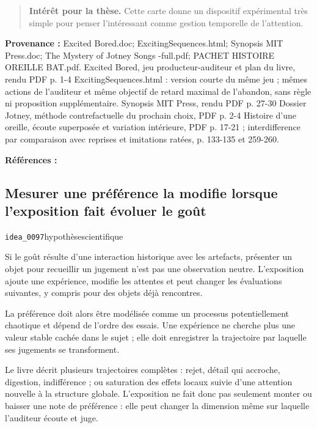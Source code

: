 \documentclass[10pt,a4paper]{article}
\begin{document}
\begin{quote}
\textbf{Intérêt pour la thèse.} Cette carte donne un dispositif expérimental très simple pour penser l'intéressant comme gestion temporelle de l'attention.
\end{quote}
{\footnotesize\color{metadata}\textbf{Provenance :} Excited Bored.doc; ExcitingSequences.html; Synopsis MIT Press.doc; The Mystery of Jotney Songs -full.pdf; PACHET HISTOIRE OREILLE BAT.pdf. Excited Bored, jeu producteur-auditeur et plan du livre, rendu PDF p. 1-4 ExcitingSequences.html : version courte du même jeu ; mêmes actions de l'auditeur et même objectif de retard maximal de l'abandon, sans règle ni proposition supplémentaire. Synopsis MIT Press, rendu PDF p. 27-30 Dossier Jotney, méthode contrefactuelle du prochain choix, PDF p. 2-4 Histoire d'une oreille, écoute superposée et variation intérieure, PDF p. 17-21 ; interdifference par comparaison avec reprises et imitations ratées, p. 133-135 et 259-260.\par}
{\footnotesize\color{metadata}\textbf{Références :} \parencite{pachet2018oreille}\par}

\subsection{Mesurer une préférence la modifie lorsque l'exposition fait évoluer le goût}
{\small\color{metadata} \texttt{idea\_0097}\quad\textbullet\quad hypothèse\quad\textbullet\quad scientifique\par}

Si le goût résulte d'une interaction historique avec les artefacts, présenter un objet pour recueillir un jugement n'est pas une observation neutre. L'exposition ajoute une expérience, modifie les attentes et peut changer les évaluations suivantes, y compris pour des objets déjà rencontres.

La préférence doit alors être modélisée comme un processus potentiellement chaotique et dépend de l'ordre des essais. Une expérience ne cherche plus une valeur stable cachée dans le sujet ; elle doit enregistrer la trajectoire par laquelle ses jugements se transforment.

Le livre décrit plusieurs trajectoires complètes : rejet, détail qui accroche, digestion, indifférence ; ou saturation des effets locaux suivie d'une attention nouvelle à la structure globale. L'exposition ne fait donc pas seulement monter ou baisser une note de préférence : elle peut changer la dimension même sur laquelle l'auditeur écoute et juge.
\end{document}

